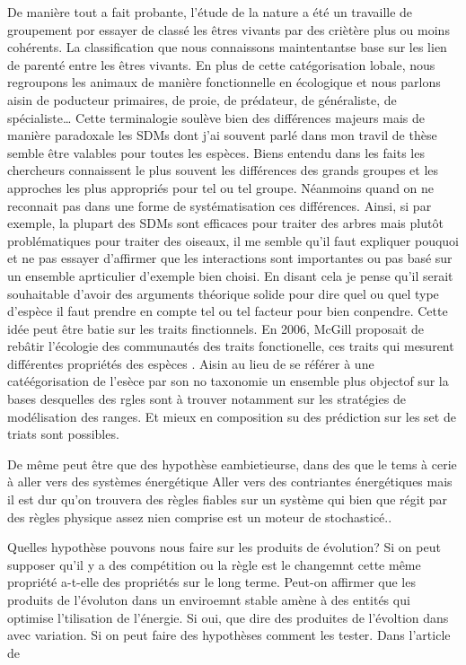 De manière tout a fait probante, l'étude de la nature a été un travaille
de groupement por essayer de classé les êtres vivants par des criètère
plus ou moins cohérents. La classification que nous connaissons
maintentantse base sur les lien de parenté entre les êtres vivants. En
plus de cette catégorisation lobale, nous regroupons les animaux de
manière fonctionnelle en écologique et nous parlons aisin de poducteur
primaires, de proie, de prédateur, de généraliste, de
spécialiste\ldots{} Cette terminalogie soulève bien des différences
majeurs mais de manière paradoxale les SDMs dont j'ai souvent parlé dans
mon travil de thèse semble être valables pour toutes les espèces. Biens
entendu dans les faits les chercheurs connaissent le plus souvent les
différences des grands groupes et les approches les plus appropriés pour
tel ou tel groupe. Néanmoins quand on ne reconnait pas dans une forme de
systématisation ces différences. Ainsi, si par exemple, la plupart des
SDMs sont efficaces pour traiter des arbres mais plutôt problématiques
pour traiter des oiseaux, il me semble qu'il faut expliquer pouquoi et
ne pas essayer d'affirmer que les interactions sont importantes ou pas
basé sur un ensemble aprticulier d'exemple bien choisi. En disant cela
je pense qu'il serait souhaitable d'avoir des arguments théorique solide
pour dire quel ou quel type d'espèce il faut prendre en compte tel ou
tel facteur pour bien conpendre. Cette idée peut être batie sur les
traits finctionnels. En 2006, McGill proposait de rebâtir l'écologie des
communautés des traits fonctionelle, ces traits qui mesurent différentes
propriétés des espèces \citep{McGill2006}. Aisin au lieu de se référer à
une catéégorisation de l'esèce par son no taxonomie un ensemble plus
objectof sur la bases desquelles des rgles sont à trouver notamment sur
les stratégies de modélisation des ranges. Et mieux en composition su
des prédiction sur les set de triats sont possibles.

De même peut être que des hypothèse eambietieurse, dans des que le tems
à cerie à aller vers des systèmes énergétique Aller vers des contriantes
énergétiques mais il est dur qu'on trouvera des règles fiables sur un
système qui bien que régit par des règles physique assez nien comprise
est un moteur de stochasticé..

Quelles hypothèse pouvons nous faire sur les produits de évolution? Si
on peut supposer qu'il y a des compétition ou la règle est le changemnt
cette même propriété a-t-elle des propriétés sur le long terme. Peut-on
affirmer que les produits de l'évoluton dans un enviroemnt stable amène
à des entités qui optimise l'tilisation de l'énergie. Si oui, que dire
des produites de l'évoltion dans avec variation. Si on peut faire des
hypothèses comment les tester. Dans l'article de


